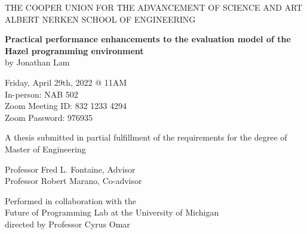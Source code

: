 \documentclass[12pt]{article}
\begin{document}
\thispagestyle{empty}

{
  \centering

  \MakeUppercase{
    The Cooper Union for the Advancement of Science and Art \\
    Albert Nerken School of Engineering \\
  }

  \vfill{}

  {
    \textbf{
      \Large
      Practical performance enhancements to the evaluation model of the Hazel programming environment \\
    }
    \vspace{1em}
    by Jonathan Lam \\
  }

  \vfill{}

  {
    Friday, April 29th, 2022 @ 11AM \\
    In-person: NAB 502 \\
    Zoom Meeting ID: 832 1233 4294 \\
    Zoom Password: 976935 \\
  }

  \vfill{}

  {
    A thesis submitted in partial fulfillment of the requirements for the degree of \\
    Master of Engineering \\
  }

  \vfill{}

  {
    Professor Fred L. Fontaine, Advisor \\
    Professor Robert Marano, Co-advisor \\
  }


  \vfill{}
  {
    Performed in collaboration with the \\
    Future of Programming Lab at the University of Michigan \\
    directed by Professor Cyrus Omar \\
  }
}
\end{document}
